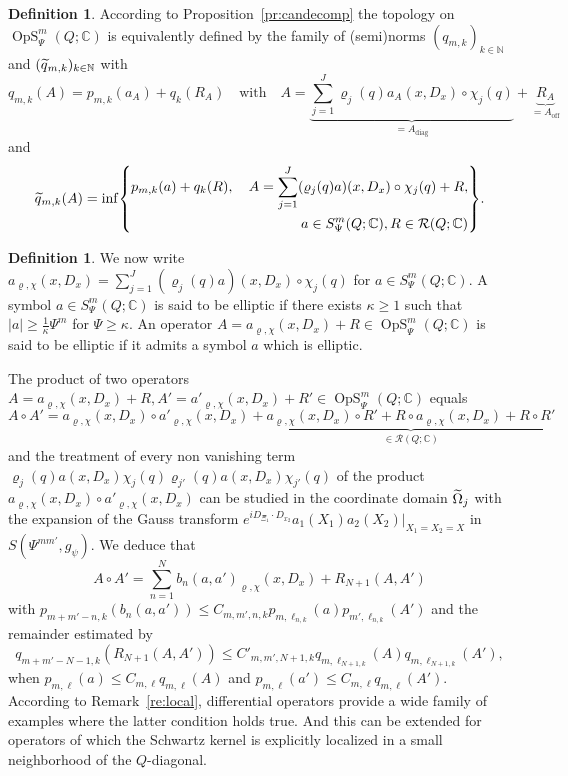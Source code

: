 \documentclass[10pt]{amsart}
\theoremstyle{definition}\newtheorem{defi}[theo]{Definition}\newtheorem{rema}[theo]{Remark}\newtheorem{exam}[theo]{Example}\newtheorem{exem}[theo]{Example}\newtheorem{nota}[theo]{Notation}
\newcommand{\C}{\mathbb{C}}
\newcommand{\N}{\mathbb{N}}
\newcommand{\clR}{\mathcal{R}}
\DeclareMathOperator{\OpS}{OpS}
\DeclareMathOperator{\offf}{off}
\DeclareMathOperator{\diag}{diag}
\let\oldtilde\tilde
\renewcommand*{\tilde}[1]{\mathchoice{\widetilde{#1}}{\widetilde{#1}}{\oldtilde{#1}}{\oldtilde{#1}}}
\let\originalleft\left
\let\originalright\right
\renewcommand{\left}{\mathopen{}\mathclose\bgroup\originalleft}
\renewcommand{\right}{\aftergroup\egroup\originalright}
\begin{document}
\begin{defi}\label{de:globaltop}
According to Proposition~\ref{pr:candecomp} the topology on $\OpS^{m}_{\Psi}(Q;\C)$ is equivalently defined by the family of (semi)norms $(q_{m,k})_{k\in\N}$ and $(\tilde{q}_{m,k})_{k\in\N}$ with
\[
q_{m,k}(A)= p_{m,k}(a_{A})+q_{k}(R_{A})\quad \text{with}\quad A=\underbrace{\sum_{j=1}^{J}\varrho_{j}(q)a_{A}(x,D_{x})\circ \chi_{j}(q)}_{=A_{\diag}} +\underbrace{R_{A}}_{=A_{\offf}}
\]
and
\begin{align*}
\tilde{q}_{m,k}(A)=\inf\left\{
\begin{aligned}
p_{m,k}(a)+q_{k}(R),\quad A=\sum_{j=1}^{J}(\varrho_{j}(q)a)(x,D_{x})\circ \chi_{j}(q)+R,\\ a\in S^{m}_{\Psi}(Q;\C), R\in \clR(Q;\C)
\end{aligned}
\right\}.
\end{align*}
\end{defi}

\begin{defi}\label{de:ellipticity}
We now write $a_{\varrho,\chi}(x,D_{x})=\sum_{j=1}^{J}(\varrho_{j}(q)a)(x,D_{x})\circ \chi_{j}(q)$ for $a\in S^{m}_{\Psi}(Q;\C)$. A symbol $a\in S^{m}_{\Psi}(Q;\C)$ is said to be elliptic if there exists $\kappa\geq 1$ such that $|a|\geq \frac{1}{\kappa}\Psi^{m}$ for $\Psi\geq \kappa$. An operator $A=a_{\varrho,\chi}(x,D_{x})+R\in \OpS^{m}_{\Psi}(Q;\C)$ is said to be elliptic if it admits a symbol $a$ which is elliptic.
\end{defi}

The product of two operators $A=a_{\varrho,\chi}(x,D_{x})+R, A'=a'_{\varrho,\chi}(x,D_{x})+R'\in \OpS^{m}_{\Psi}(Q;\C)$ equals
\[
A\circ A'=a_{\varrho,\chi}(x,D_{x})\circ a'_{\varrho,\chi}(x,D_{x}) + \underbrace{a_{\varrho,\chi}(x,D_{x})\circ R'+R\circ a_{\varrho,\chi}(x,D_{x})+R\circ R'}_{\in \clR(Q;\C)}
\]
and the treatment of every non vanishing term $\varrho_{j}(q)a(x,D_{x})\chi_{j}(q)\varrho_{j'}(q)a(x,D_{x})\chi_{j'}(q)$ of the product $a_{\varrho,\chi}(x,D_{x})\circ a'_{\varrho,\chi}(x,D_{x})$ can be studied in the coordinate domain $\tilde{\Omega}_{j}$ with the expansion of the Gauss transform $e^{iD_{\Xi_{1}}\cdot D_{x_{2}}}a_{1}(X_{1})a_{2}(X_{2})|_{X_{1}=X_{2}=X}$ in $S(\Psi^{mm'},g_{\psi})$. We deduce that
\[
A\circ A'=\sum_{n=1}^{N}b_{n}(a,a')_{\varrho,\chi}(x,D_{x})+R_{N+1}(A,A')
\]
with $p_{m+m'-n,k}(b_{n}(a,a'))\leq C_{m,m',n,k}p_{m,\ell_{n,k}}(a)p_{m',\ell_{n,k}}(A')$ and the remainder estimated by
\[
q_{m+m'-N-1,k}(R_{N+1}(A,A'))\leq C'_{m,m',N+1,k}q_{m,\ell_{N+1,k}}(A)q_{m,\ell_{N+1,k}}(A'),
\]
when $p_{m,\ell}(a)\leq C_{m,\ell} q_{m,\ell}(A)$ and $p_{m,\ell}(a')\leq C_{m,\ell} q_{m,\ell}(A')$. According to Remark~\ref{re:local}, differential operators provide a wide family of examples where the latter condition holds true. And this can be extended for operators of which the Schwartz kernel is explicitly localized in a small neighborhood of the $Q$-diagonal.
\end{document}
